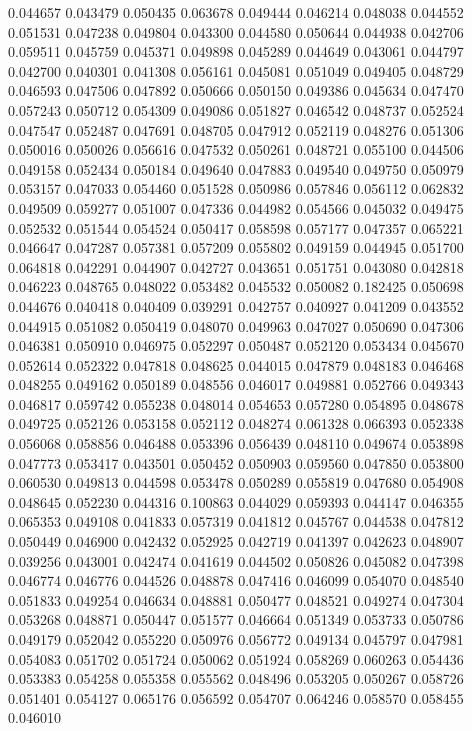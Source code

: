 0.044657
0.043479
0.050435
0.063678
0.049444
0.046214
0.048038
0.044552
0.051531
0.047238
0.049804
0.043300
0.044580
0.050644
0.044938
0.042706
0.059511
0.045759
0.045371
0.049898
0.045289
0.044649
0.043061
0.044797
0.042700
0.040301
0.041308
0.056161
0.045081
0.051049
0.049405
0.048729
0.046593
0.047506
0.047892
0.050666
0.050150
0.049386
0.045634
0.047470
0.057243
0.050712
0.054309
0.049086
0.051827
0.046542
0.048737
0.052524
0.047547
0.052487
0.047691
0.048705
0.047912
0.052119
0.048276
0.051306
0.050016
0.050026
0.056616
0.047532
0.050261
0.048721
0.055100
0.044506
0.049158
0.052434
0.050184
0.049640
0.047883
0.049540
0.049750
0.050979
0.053157
0.047033
0.054460
0.051528
0.050986
0.057846
0.056112
0.062832
0.049509
0.059277
0.051007
0.047336
0.044982
0.054566
0.045032
0.049475
0.052532
0.051544
0.054524
0.050417
0.058598
0.057177
0.047357
0.065221
0.046647
0.047287
0.057381
0.057209
0.055802
0.049159
0.044945
0.051700
0.064818
0.042291
0.044907
0.042727
0.043651
0.051751
0.043080
0.042818
0.046223
0.048765
0.048022
0.053482
0.045532
0.050082
0.182425
0.050698
0.044676
0.040418
0.040409
0.039291
0.042757
0.040927
0.041209
0.043552
0.044915
0.051082
0.050419
0.048070
0.049963
0.047027
0.050690
0.047306
0.046381
0.050910
0.046975
0.052297
0.050487
0.052120
0.053434
0.045670
0.052614
0.052322
0.047818
0.048625
0.044015
0.047879
0.048183
0.046468
0.048255
0.049162
0.050189
0.048556
0.046017
0.049881
0.052766
0.049343
0.046817
0.059742
0.055238
0.048014
0.054653
0.057280
0.054895
0.048678
0.049725
0.052126
0.053158
0.052112
0.048274
0.061328
0.066393
0.052338
0.056068
0.058856
0.046488
0.053396
0.056439
0.048110
0.049674
0.053898
0.047773
0.053417
0.043501
0.050452
0.050903
0.059560
0.047850
0.053800
0.060530
0.049813
0.044598
0.053478
0.050289
0.055819
0.047680
0.054908
0.048645
0.052230
0.044316
0.100863
0.044029
0.059393
0.044147
0.046355
0.065353
0.049108
0.041833
0.057319
0.041812
0.045767
0.044538
0.047812
0.050449
0.046900
0.042432
0.052925
0.042719
0.041397
0.042623
0.048907
0.039256
0.043001
0.042474
0.041619
0.044502
0.050826
0.045082
0.047398
0.046774
0.046776
0.044526
0.048878
0.047416
0.046099
0.054070
0.048540
0.051833
0.049254
0.046634
0.048881
0.050477
0.048521
0.049274
0.047304
0.053268
0.048871
0.050447
0.051577
0.046664
0.051349
0.053733
0.050786
0.049179
0.052042
0.055220
0.050976
0.056772
0.049134
0.045797
0.047981
0.054083
0.051702
0.051724
0.050062
0.051924
0.058269
0.060263
0.054436
0.053383
0.054258
0.055358
0.055562
0.048496
0.053205
0.050267
0.058726
0.051401
0.054127
0.065176
0.056592
0.054707
0.064246
0.058570
0.058455
0.046010
